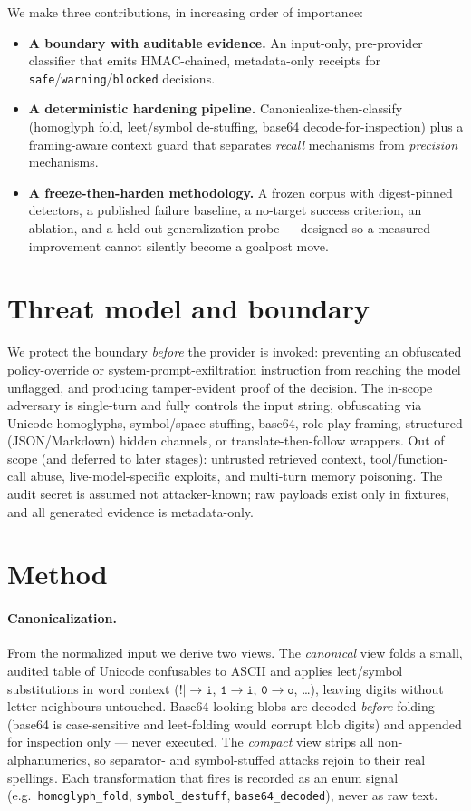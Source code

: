 \documentclass[11pt]{article}
\newcommand{\safe}{\texttt{safe}}
\newcommand{\warning}{\texttt{warning}}
\newcommand{\blocked}{\texttt{blocked}}
\begin{document}
We make three contributions, in increasing order of importance:
\begin{itemize}
  \item \textbf{A boundary with auditable evidence.} An input-only, pre-provider
  classifier that emits HMAC-chained, metadata-only receipts for \safe/\warning/\blocked{}
  decisions.
  \item \textbf{A deterministic hardening pipeline.} Canonicalize-then-classify (homoglyph
  fold, leet/symbol de-stuffing, base64 decode-for-inspection) plus a framing-aware
  context guard that separates \emph{recall} mechanisms from \emph{precision} mechanisms.
  \item \textbf{A freeze-then-harden methodology.} A frozen corpus with digest-pinned
  detectors, a published failure baseline, a no-target success criterion, an ablation, and
  a held-out generalization probe --- designed so a measured improvement cannot silently
  become a goalpost move.
\end{itemize}

\section{Threat model and boundary}
We protect the boundary \emph{before} the provider is invoked: preventing an obfuscated
policy-override or system-prompt-exfiltration instruction from reaching the model
unflagged, and producing tamper-evident proof of the decision. The in-scope adversary is
single-turn and fully controls the input string, obfuscating via Unicode homoglyphs,
symbol/space stuffing, base64, role-play framing, structured (JSON/Markdown) hidden
channels, or translate-then-follow wrappers. Out of scope (and deferred to later stages):
untrusted retrieved context, tool/function-call abuse, live-model-specific exploits, and
multi-turn memory poisoning. The audit secret is assumed not attacker-known; raw payloads
exist only in fixtures, and all generated evidence is metadata-only.

\section{Method}
\paragraph{Canonicalization.} From the normalized input we derive two views. The
\emph{canonical} view folds a small, audited table of Unicode confusables to ASCII and
applies leet/symbol substitutions in word context ($\mathtt{!|}\rightarrow\mathtt{i}$,
$\mathtt{1}\rightarrow\mathtt{i}$, $\mathtt{0}\rightarrow\mathtt{o}$, \dots), leaving
digits without letter neighbours untouched. Base64-looking blobs are decoded \emph{before}
folding (base64 is case-sensitive and leet-folding would corrupt blob digits) and appended
for inspection only --- never executed. The \emph{compact} view strips all
non-alphanumerics, so separator- and symbol-stuffed attacks rejoin to their real
spellings. Each transformation that fires is recorded as an enum signal (e.g.\
\texttt{homoglyph\_fold}, \texttt{symbol\_destuff}, \texttt{base64\_decoded}), never as raw
text.
\end{document}
